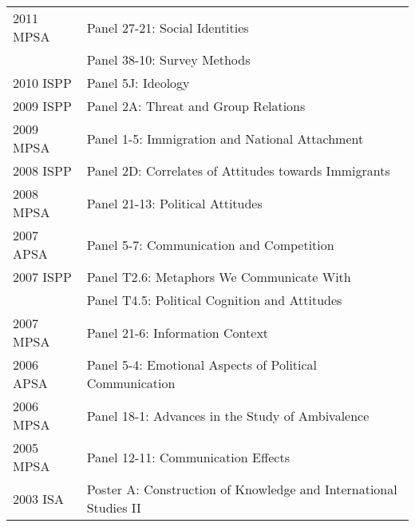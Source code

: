 \documentclass[12pt]{article}
\begin{document}
\begin{longtable}{@{}p{3.5cm}@{}l}
            2011 MPSA & {Panel 27-21: Social Identities}\\
            
            & {Panel 38-10: Survey Methods}\\
            
            2010 ISPP & {Panel 5J: Ideology}\\
            
            2009 ISPP & {Panel 2A: Threat and Group Relations}\\
            
            2009 MPSA & {Panel 1-5: Immigration and National Attachment}\\
            
            2008 ISPP & {Panel 2D: Correlates of Attitudes towards Immigrants}\\
            
            2008 MPSA & {Panel 21-13: Political Attitudes}\\
            
            2007 APSA & {Panel 5-7: Communication and Competition}\\
            
            2007 ISPP & {Panel T2.6: Metaphors We Communicate With}\\
            
            & {Panel T4.5: Political Cognition and Attitudes}\\
            
            2007 MPSA & {Panel 21-6: Information Context}\\
            
            2006 APSA & {Panel 5-4: Emotional Aspects of 
            Political Communication}\\
            
            2006 MPSA & {Panel 18-1: Advances in the Study of Ambivalence}\\
            
            2005 MPSA & {Panel 12-11: Communication Effects}\\
            
            2003 ISA & {Poster A: Construction of 
            Knowledge and International Studies II}\\

\end{longtable}
		
\vspace*{.25cm}
\end{document}

